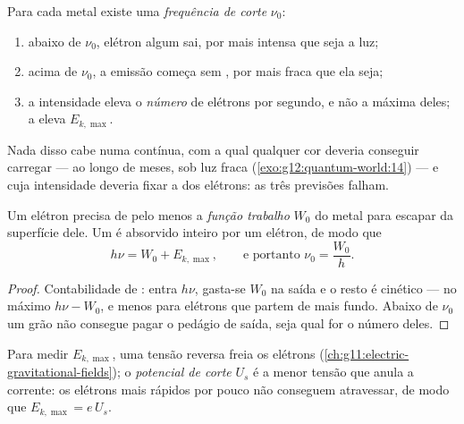 \begin{proposition}\label{prop:g12:quantum-world:facts}
Para cada metal existe uma \emph{frequência de corte} $\nu_0$:
\begin{enumerate}
  \item abaixo de $\nu_0$, elétron algum sai, por mais intensa que seja a luz;
  \item acima de $\nu_0$, a emissão começa sem , por mais fraca que ela seja;
  \item a intensidade eleva o \emph{número} de elétrons por segundo, e não a  máxima deles; a  eleva $E_{k,\max}$.
\end{enumerate}
Nada disso cabe numa  contínua, com a qual qualquer cor deveria conseguir carregar
--- ao longo de meses, sob luz fraca (\cref{exo:g12:quantum-world:14}) --- e cuja
intensidade deveria fixar a  dos elétrons: as três previsões falham.
\end{proposition}
\admitted

\begin{theorem}\label{thm:g12:quantum-world:einstein}
Um elétron precisa de pelo menos a \emph{função
trabalho} $W_0$ do metal para escapar da superfície dele. Um
 é absorvido inteiro por um elétron, de modo que
\[
h\nu = W_0 + E_{k,\max}, \qquad \text{e portanto } \nu_0 = \frac{W_0}{h}.
\]
\end{theorem}

\begin{proof}
Contabilidade de : entra $h\nu$, gasta-se $W_0$ na saída e o resto é cinético ---
no máximo $h\nu - W_0$, e menos para elétrons que partem de mais fundo. Abaixo de
$\nu_0$ um grão não consegue pagar o pedágio de saída, seja qual for o número deles.
\end{proof}

\begin{definition}\label{def:g12:quantum-world:stopping}
Para medir $E_{k,\max}$, uma tensão reversa freia os elétrons
(\cref{ch:g11:electric-gravitational-fields}); o \emph{potencial de
corte} $U_s$ é a menor tensão que anula a corrente: os
elétrons mais rápidos por pouco não conseguem atravessar, de modo que
$E_{k,\max} = e\,U_s$.
\end{definition}

